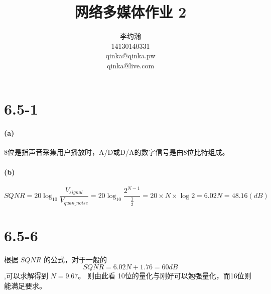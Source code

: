 \documentclass{ctexart}
\title{网络多媒体作业 2}
\author{李约瀚 \\ 14130140331 \\ qinka@qinka.pw \\ qinka@live.com}
\begin{document}
    \maketitle
    \section*{6.5-1}
    \paragraph{(a)} 8位是指声音采集用户播放时，A/D或D/A的数字信号是由8位比特组成。
    \paragraph{(b)} 
    $$SQNR=20\log_{10}\frac{V_{signal}}{V_{quan\_noise}}=20\log_{10}\frac{2^{N-1}}{\frac{1}{2}}=20\times N \times \log2=6.02N=48.16(dB)$$
    \section*{6.5-6}
    根据 $SQNR$ 的公式，对于一般的 $$SQNR=6.02N+1.76=60dB$$,可以求解得到 $N=9.67$。
    则由此看 10位的量化与刚好可以勉强量化，而16位则能满足要求。
\end{document}
